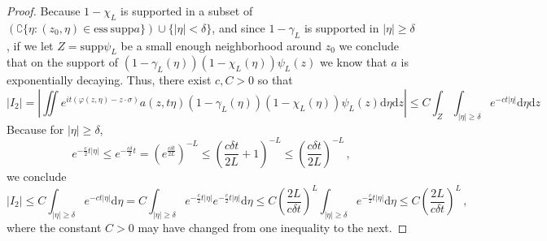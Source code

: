 \documentclass[
	fontsize=11pt, 
	twoside=false, 
	abstract=true, 
	a4paper,
]{scrartcl}
\newcommand{\dd}{\mathrm{d}}
\newcommand{\abs}[1]{\left\lvert#1\right\rvert}
\newcommand{\supp}{\mathrm{supp}}
\newcommand{\es}{\mathrm{ess}\ \mathrm{supp}}
\begin{document}
\begin{proof}
	Because $1-\chi_L$ is supported in a subset of $(\complement\{\eta \colon (z_0,\eta)\in \es a\}) \cup \{\abs{\eta} < \delta\}$, and since $1-\gamma_L$ is supported in $\abs{\eta}\geq \delta$, if we let $Z = \supp \psi_L$ be a small enough neighborhood around $z_0$ we conclude that on the support of $(1-\gamma_L(\eta))(1-\chi_L(\eta))\psi_L(z)$ we know that $a$ is exponentially decaying. Thus, 
	there exist $c,C >0$ so that
	\[
		\abs{I_2} = \abs{\iint e^{it(\varphi(z,\eta)-z\cdot \sigma)}a(z,t\eta)(1-\gamma_L(\eta))(1-\chi_L(\eta))\psi_L(z)\dd\eta\dd z} \leq C\int_Z \int_{\abs{\eta}\geq \delta} e^{-ct\abs{\eta}}\dd\eta\dd z 
	\]
	Because for $\abs{\eta} \geq \delta$, 
	\[
		e^{-\frac{c}{2} t\abs{\eta}} \leq e^{-\frac{c\delta}{2} t} = \left(e^{\frac{c\delta t}{2L}}\right)^{-L} \leq \left(\frac{c\delta t}{2L} +1\right)^{-L} \leq \left(\frac{c\delta t}{2L}\right)^{-L}\,,
	\]
	we conclude
	\[
		\abs{I_2} \leq C\int_{\abs{\eta}\geq \delta} e^{-ct\abs{\eta}}\dd\eta = C\int_{\abs{\eta}\geq \delta} e^{-\frac{c}{2} t\abs{\eta}}e^{-\frac{c}{2} t\abs{\eta}}\dd\eta \leq C\left(\frac{2L}{c\delta t}\right)^L \int_{\abs{\eta}\geq \delta} e^{-\frac{c}{2} t\abs{\eta}}\dd\eta \leq C \left(\frac{2L}{c\delta t}\right)^L\,,
	\]
	where the constant $C>0$ may have changed from one inequality to the next.
		

\end{proof}
\end{document}
